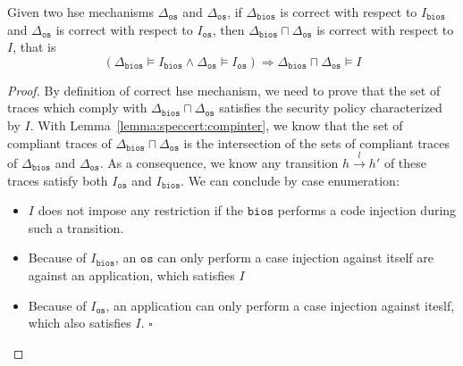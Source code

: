 \begin{theorem}
  Given two \ac{hse} mechanisms \( \Delta_{\mathtt{os}} \) and
  \( \Delta_{\mathtt{os}} \), if \( \Delta_{\mathtt{bios}} \) is correct with
  respect to \( I_{\mathtt{bios}} \) and \( \Delta_{\mathtt{os}} \) is correct
  with respect to \( I_{\mathtt{os}} \), then
  \( \Delta_{\mathtt{bios}} \sqcap \Delta_{\mathtt{os}} \) is correct with
  respect to \( I \), that is
  \[
    (\Delta_{\mathtt{bios}} \models I_{\mathtt{bios}} \wedge
    \Delta_{\mathtt{os}} \models I_{\mathtt{os}}) \Rightarrow
    \Delta_{\mathtt{bios}} \sqcap \Delta_{\mathtt{os}} \models I
  \]

  \begin{proof}
    By definition of correct \ac{hse} mechanism, we need to prove that the set
    of traces which comply with
    \( \Delta_{\mathtt{bios}} \sqcap \Delta_{\mathtt{os}} \) satisfies the
    security policy characterized by \( I \).
    With Lemma~\ref{lemma:speccert:compinter}, we know that the set of compliant
    traces of \( \Delta_{\mathtt{bios}} \sqcap \Delta_{\mathtt{os}} \) is the
    intersection of the sets of compliant traces of \( \Delta_{\mathtt{bios}} \)
    and \( \Delta_{\mathtt{os}} \).
    As a consequence, we know any transition \( h \xrightarrow{l} h' \) of these
    traces satisfy both \( I_{\mathtt{os}} \) and \( I_{\mathtt{bios}} \).
    We can conclude by case enumeration:
    \begin{itemize}
    \item \( I \) does not impose any restriction if the \( \mathtt{bios} \)
      performs a code injection during such a transition.
    \item Because of \( I_{\mathtt{bios}} \), an \( \mathtt{os} \) can only
      perform a case injection against itself are against an application, which
      satisfies \( I \)
    \item Because of \( I_{\mathtt{os}} \), an application can only perform a
      case injection against iteslf, which also satisfies \( I \). \hfill
      \( \square \)
    \end{itemize}
  \end{proof}
\end{theorem}

\subsection*{}

